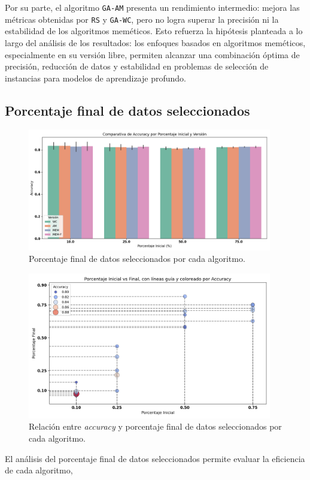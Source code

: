 Por su parte, el algoritmo \texttt{GA-AM} presenta un rendimiento intermedio: mejora las métricas obtenidas por \texttt{RS} y \texttt{GA-WC},
pero no logra superar la precisión ni la estabilidad de los algoritmos meméticos.
Esto refuerza la hipótesis planteada a lo largo del análisis de los resultados: los enfoques basados en algoritmos meméticos,
especialmente en su versión libre, permiten alcanzar una combinación óptima de precisión,
reducción de datos y estabilidad en problemas de selección de instancias para modelos de aprendizaje profundo.

\subsection{Porcentaje final de datos seleccionados}\label{sec:porcentaje-final-datos-seleccionados}
\begin{figure}[htp]
    \centering
    \includegraphics[width=0.95\textwidth]{imagenes/evaluaciones/final/barplot-por-porcentaje}
    \caption{Porcentaje final de datos seleccionados por cada algoritmo.}
    \label{fig:barplot-por-porcentaje}
\end{figure}
\begin{figure}[htp]
    \centering
    \includegraphics[width=0.95\textwidth]{imagenes/evaluaciones/final/scatter}
    \caption{Relación entre \textit{accuracy} y porcentaje final de datos seleccionados por cada algoritmo.}
    \label{fig:scatter-final}
\end{figure}El análisis del porcentaje final de datos seleccionados permite evaluar la eficiencia de cada algoritmo,
